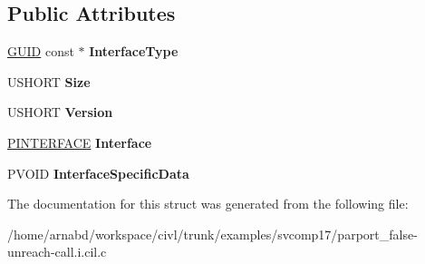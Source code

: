 \subsection*{Public Attributes}
\begin{DoxyCompactItemize}
\item 
\hypertarget{struct____anonstruct__QueryInterface__71_a54fa5b029d46177f04fcd33b3a67b6b2}{}\hyperlink{struct__GUID}{G\+U\+I\+D} const $\ast$ {\bfseries Interface\+Type}\label{struct____anonstruct__QueryInterface__71_a54fa5b029d46177f04fcd33b3a67b6b2}

\item 
\hypertarget{struct____anonstruct__QueryInterface__71_a989413a0ad888f44eda23abaedced626}{}U\+S\+H\+O\+R\+T {\bfseries Size}\label{struct____anonstruct__QueryInterface__71_a989413a0ad888f44eda23abaedced626}

\item 
\hypertarget{struct____anonstruct__QueryInterface__71_a4ea346a342a08b1a96fa7159eb685413}{}U\+S\+H\+O\+R\+T {\bfseries Version}\label{struct____anonstruct__QueryInterface__71_a4ea346a342a08b1a96fa7159eb685413}

\item 
\hypertarget{struct____anonstruct__QueryInterface__71_a445568d4fa35d4175821bbc1c58c2bf9}{}\hyperlink{struct__INTERFACE}{P\+I\+N\+T\+E\+R\+F\+A\+C\+E} {\bfseries Interface}\label{struct____anonstruct__QueryInterface__71_a445568d4fa35d4175821bbc1c58c2bf9}

\item 
\hypertarget{struct____anonstruct__QueryInterface__71_a64708b82e35000be24481e54e538c0ff}{}P\+V\+O\+I\+D {\bfseries Interface\+Specific\+Data}\label{struct____anonstruct__QueryInterface__71_a64708b82e35000be24481e54e538c0ff}

\end{DoxyCompactItemize}


The documentation for this struct was generated from the following file\+:\begin{DoxyCompactItemize}
\item 
/home/arnabd/workspace/civl/trunk/examples/svcomp17/parport\+\_\+false-\/unreach-\/call.\+i.\+cil.\+c\end{DoxyCompactItemize}
